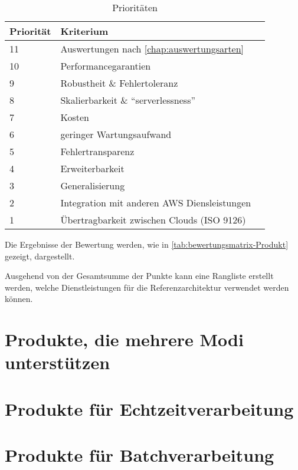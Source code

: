 \begin{table}[H]
\centering
\begin{tabular}{|l|l|l|}
\hline
Priorität & Kriterium \\ \hline
11 & Auswertungen nach \autoref{chap:auswertungsarten}\\ \hline
10 & Performancegarantien\\ \hline
9 & Robustheit \& Fehlertoleranz\\ \hline
8 & Skalierbarkeit \& \enquote{serverlessness} \\ \hline
7 & Kosten \\ \hline
6 & geringer Wartungsaufwand \\ \hline
5 & Fehlertransparenz \\ \hline
4 & Erweiterbarkeit \\ \hline
3 & Generalisierung \\ \hline
2 & Integration mit anderen \ac{AWS} Diensleistungen \\ \hline
1 & Übertragbarkeit zwischen Clouds (ISO 9126) \\ \hline
\end{tabular}
\caption{Prioritäten}
\label{tab:prioritaeten}
\end{table}



Die Ergebnisse der Bewertung werden, wie in \autoref{tab:bewertungsmatrix-Produkt} gezeigt, dargestellt.


Ausgehend von der Gesamtsumme der Punkte kann eine Rangliste erstellt werden, welche Dienstleistungen für die Referenzarchitektur verwendet werden können.

\section{Produkte, die mehrere Modi unterstützen}


\section{Produkte für Echtzeitverarbeitung}\label{produkte:echtzeit}



\section{Produkte für Batchverarbeitung}




